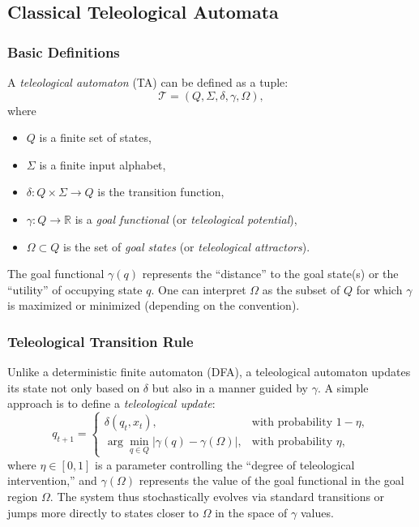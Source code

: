 \documentclass[12pt]{article}
\begin{document}
\subsection{Classical Teleological Automata}

\subsubsection{Basic Definitions}

A \emph{teleological automaton} (TA) can be defined as a tuple:
\[
\mathcal{T} = (Q, \Sigma, \delta, \gamma, \Omega),
\]
where
\begin{itemize}
    \item $Q$ is a finite set of states,
    \item $\Sigma$ is a finite input alphabet,
    \item $\delta: Q \times \Sigma \to Q$ is the transition function,
    \item $\gamma: Q \to \mathbb{R}$ is a \emph{goal functional} (or \emph{teleological potential}),
    \item $\Omega \subset Q$ is the set of \emph{goal states} (or \emph{teleological attractors}).
\end{itemize}

The goal functional $\gamma(q)$ represents the ``distance'' to the goal state(s) or the ``utility'' of occupying state $q$. One can interpret $\Omega$ as the subset of $Q$ for which $\gamma$ is maximized or minimized (depending on the convention).

\subsubsection{Teleological Transition Rule}

Unlike a deterministic finite automaton (DFA), a teleological automaton updates its state not only based on $\delta$ but also in a manner guided by $\gamma$. A simple approach is to define a \emph{teleological update}:
\[
q_{t+1} = \begin{cases}
\delta(q_t, x_t), & \text{with probability } 1 - \eta,\\
\arg \min_{q \in Q} \big|\gamma(q) - \gamma(\Omega)\big|, & \text{with probability } \eta,
\end{cases}
\]
where $\eta \in [0,1]$ is a parameter controlling the ``degree of teleological intervention,'' and $\gamma(\Omega)$ represents the value of the goal functional in the goal region $\Omega$. The system thus stochastically evolves via standard transitions or jumps more directly to states closer to $\Omega$ in the space of $\gamma$ values.
\end{document}
